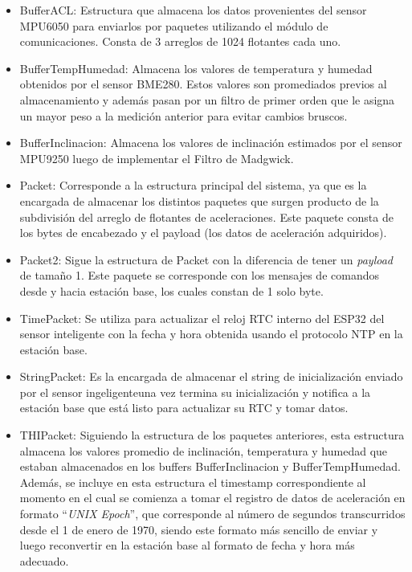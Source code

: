 \begin{itemize}
    \item BufferACL: Estructura que almacena los datos provenientes del sensor MPU6050 para enviarlos por paquetes utilizando el módulo de comunicaciones. Consta de 3 arreglos de 1024 flotantes cada uno.
    \item BufferTempHumedad: Almacena los valores de temperatura y humedad obtenidos por el sensor BME280. Estos valores son promediados previos al almacenamiento y además pasan por un filtro de primer orden que le asigna un mayor peso a la medición anterior para evitar cambios bruscos.
    \item BufferInclinacion: Almacena los valores de inclinación estimados por el sensor MPU9250 luego de implementar el Filtro de Madgwick.
    \item Packet: Corresponde a la estructura principal del sistema, ya que es la encargada de almacenar los distintos paquetes que surgen producto de la subdivisión del arreglo de flotantes de aceleraciones. Este paquete consta de los bytes de encabezado y el payload (los datos de aceleración adquiridos).
    \item Packet2: Sigue la estructura de Packet con la diferencia de tener un \textit{payload} de tamaño 1. Este paquete se corresponde con los mensajes de comandos desde y hacia estación base, los cuales constan de 1 solo byte.
    \item TimePacket: Se utiliza para actualizar el reloj RTC interno del ESP32 del sensor inteligente con la fecha y hora obtenida usando el protocolo NTP en la estación base.
    \item StringPacket: Es la encargada de almacenar el string de inicialización enviado por el sensor ingeligenteuna vez termina su inicialización y notifica a la estación base que está listo para actualizar su RTC y tomar datos.
    \item THIPacket: Siguiendo la estructura de los paquetes anteriores, esta estructura almacena los valores promedio de inclinación, temperatura y humedad que estaban almacenados en los buffers BufferInclinacion y BufferTempHumedad. Además, se incluye en esta estructura el timestamp correspondiente al momento en el cual se comienza a tomar el registro de datos de aceleración en formato ``\textit{UNIX Epoch}'', que corresponde al número de segundos transcurridos desde el 1 de enero de 1970, siendo este formato más sencillo de enviar y luego reconvertir en la estación base al formato de fecha y hora más adecuado.
\end{itemize}


